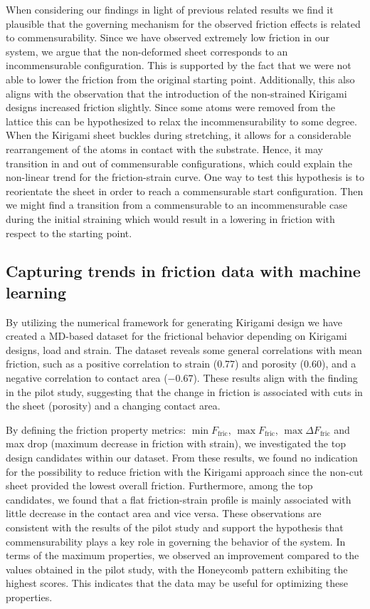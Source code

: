 When considering our findings in light of previous related results we find it
plausible that the governing mechanism for the observed friction effects is
related to commensurability. Since we have observed extremely low friction in
our system, we argue that the non-deformed sheet corresponds to an
incommensurable configuration. This is supported by the fact that we were not
able to lower the friction from the original starting point. Additionally, this
also aligns with the observation that the introduction of the non-strained
Kirigami designs increased friction slightly. Since some atoms were removed from
the lattice this can be hypothesized to relax the incommensurability to some
degree. When the Kirigami sheet buckles during stretching, it allows for a
considerable rearrangement of the atoms in contact with the substrate. Hence, it
may transition in and out of commensurable configurations, which could explain
the non-linear trend for the friction-strain curve. One way to test this
hypothesis is to reorientate the sheet in order to reach a commensurable start
configuration. Then we might find a transition from a commensurable to an
incommensurable case during the initial straining which would result in a
lowering in friction with respect to the starting point. 



\subsection{Capturing trends in friction data with machine learning}
By utilizing the numerical framework for generating Kirigami design we have
created a \acrshort{MD}-based dataset for the frictional behavior depending on
Kirigami designs, load and strain. The dataset reveals some general correlations
with mean friction, such as a positive correlation to strain (0.77) and porosity
(0.60), and a negative correlation to contact area ($-0.67$). These results
align with the finding in the pilot study, suggesting that the change in
friction is associated with cuts in the sheet (porosity) and a changing contact
area. 

By defining the friction property metrics: $\min F_{\text{fric}}$, $\max
F_{\text{fric}}$, $\max \Delta F_{\text{fric}}$ and max drop (maximum decrease
in friction with strain), we investigated the top design candidates within our
dataset. From these results, we found no indication for the possibility to
reduce friction with the Kirigami approach since the non-cut sheet provided the
lowest overall friction. Furthermore, among the top candidates, we found that a
flat friction-strain profile is mainly associated with little decrease in the
contact area and vice versa. These observations are consistent with the results
of the pilot study and support the hypothesis that commensurability plays a key
role in governing the behavior of the system. In terms of the maximum
properties, we observed an improvement compared to the values obtained in the
pilot study, with the Honeycomb pattern exhibiting the highest scores. This
indicates that the data may be useful for optimizing these properties. 

